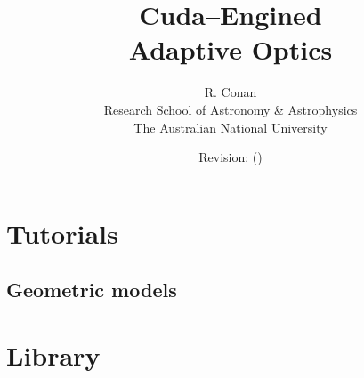 \documentclass[a4paper,oldfontcommands]{memoir}
\begin{document}
\title{{\Huge\bf C}uda--{\Huge\bf E}ngined\\Adaptive {\Huge\bf O}ptics}
\author{R. Conan\\\small Research School of Astronomy \& Astrophysics\\\small The Australian National University}
\date{Revision\gitVtags\gitReferences: \gitAbbrevHash{} (\gitAuthorDate)}

\maketitle

\tableofcontents

\part{Tutorials}
\chapter{Geometric models}


\part{Library}




%
\end{document}
